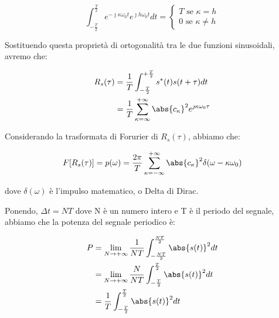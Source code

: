{
    \Large 
    \begin{equation}
        \int_{-\frac{T}{2}}^{\frac{T}{2}}
        e^{-\jmath \kappa \omega_0 t}
        e^{\jmath h \omega_0 t}
        dt 
        = 
        \begin{cases}
                T \text{ se } \kappa = h \\ 
                0 \text{ se } \kappa \neq  h 
        \end{cases}
    \end{equation}
}

Sostituendo questa proprietà di ortogonalità tra le due funzioni sinusoidali, 
avremo che: 

{
    \Large 
    \begin{equation}
        \begin{split}
            R_s (\tau)
            &= 
            \frac{1}{T} 
            \int_{- \frac{T}{2}}^{+\frac{T}{2}} 
            s^{*} (t) s(t + \tau) dt 
            \\
            &= 
            \frac{1}{T} 
            \sum_{\kappa = \infty}^{+\infty} 
            \abs{c_\kappa}^{2} 
            e^{\jmath \kappa \omega_0 \tau}
        \end{split}
    \end{equation}
}

Considerando la trasformata di Forurier di $R_s(\tau)$, abbiamo che: 

{
    \Large 
    \begin{equation}
        F[R_s (\tau)] 
        = 
        p(\omega) 
        = 
        \frac{2 \pi}{T} 
        \sum_{\kappa = - \infty}^{+\infty}
        \abs{c_\kappa} ^{2} 
        \delta (\omega - \kappa \omega_0)
    \end{equation}
} 

dove $\delta (\omega)$ è l'impulso matematico, o Delta di Dirac. \newline 

Ponendo, $\Delta t = NT$ dove N è un numero intero e T è il periodo del segnale, abbiamo che la potenza 
del segnale periodico è: 

{
    \Large 
    \begin{equation}
        \begin{split}
            P 
            &= 
            \lim_{N \rightarrow +\infty} 
            \frac{1}{NT} 
            \int_{-\frac{NT}{2}}^{\frac{NT}{2}} 
            \abs{s(t)}^{2} 
            dt 
            \\ 
            &=
            \lim_{N \rightarrow +\infty} 
            \frac{N}{NT} 
            \int_{-\frac{T}{2}}^{\frac{T}{2}} 
            \abs{s(t)}^{2} 
            dt
            \\
            &=  
            \frac{1}{T} 
            \int_{-\frac{T}{2}}^{\frac{T}{2}} 
            \abs{s(t)}^{2} 
            dt
        \end{split}
    \end{equation}
}

